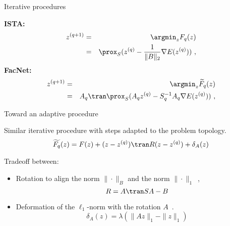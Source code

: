 \documentclass[defense.tex]{subfiles}
\begin{document}
\begin{frame}{Iterative procedures}

	\textbf{ISTA:}\\
	\begin{eqnarray*}
		z^{(q+1)} & = & \argmin_z F_q(z)\\
		          & = & \prox_{S}( z^{(q)} -  \frac{1}{\|B\|_2} \nabla E(z^{(q)}))~,
	\end{eqnarray*}
	\textbf{FacNet:}\\
	\begin{eqnarray*}
		z^{(q+1)} & = & \argmin_z \widetilde F_q(z)\\
			& = & A_q\tran \prox_{S}( A_qz^{(q)} - S_q^{-1}A_q \nabla E(z^{(q)}))~,
	\end{eqnarray*}
	
\end{frame}


\begin{frame}{Toward an adaptive procedure}
	

	Similar iterative procedure with steps adapted to the problem topology.\\[1em]
	\[
		\widetilde{F_q}(z) = F(z) + (z-z^{(q)})\tran R(z-z^{(q)}) + \delta_A(z)
	\]


	Tradeoff between:\\[.3em]
	\begin{itemize}\itemsep1em
		\item Rotation to align the norm $\|\cdot\|_B$ and the norm $\|\cdot\|_1$~,
		\[ R = A\tran SA - B\]
		\item Deformation of the $\ell_1$-norm with the rotation $A$~.
		\[ \delta_A(z) = \lambda\left(\|Az\|_1-\|z\|_1\right) \]
	\end{itemize}
	
\end{frame}


\end{document}
